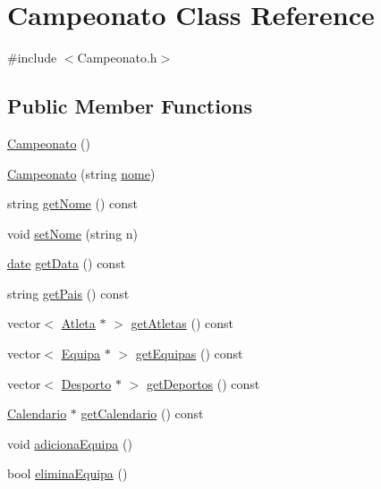 \hypertarget{class_campeonato}{}\section{Campeonato Class Reference}
\label{class_campeonato}


{\ttfamily \#include $<$Campeonato.\+h$>$}

\subsection*{Public Member Functions}
\begin{DoxyCompactItemize}
\item 
\hyperlink{class_campeonato_aa14214a5863681b19922ad1515a3d14b}{Campeonato} ()
\item 
\hyperlink{class_campeonato_a6cdd161a2ea5ffd62810e8bfd4a4dc6c}{Campeonato} (string \hyperlink{class_campeonato_a670b0857b7a8bc3c5dbf0f927ee192fe}{nome})
\item 
string \hyperlink{class_campeonato_ae014ca753715e808b6d67c73f241f27d}{get\+Nome} () const 
\item 
void \hyperlink{class_campeonato_ab2654ae701c2418dab5c70aa4cd74b57}{set\+Nome} (string n)
\item 
\hyperlink{structdate}{date} \hyperlink{class_campeonato_ab78957e0803c30d318455d3d2b4f843b}{get\+Data} () const 
\item 
string \hyperlink{class_campeonato_a152f1d8474275af981214ed24663bf3f}{get\+Pais} () const 
\item 
vector$<$ \hyperlink{class_atleta}{Atleta} $\ast$ $>$ \hyperlink{class_campeonato_ab37dc7253ffed81cc81e90c569d83cf9}{get\+Atletas} () const 
\item 
vector$<$ \hyperlink{class_equipa}{Equipa} $\ast$ $>$ \hyperlink{class_campeonato_ac82ee7c13b116b71525cff9f557b45c2}{get\+Equipas} () const 
\item 
vector$<$ \hyperlink{class_desporto}{Desporto} $\ast$ $>$ \hyperlink{class_campeonato_aa07da18865320276e7ea4506cc81d8fe}{get\+Deportos} () const 
\item 
\hyperlink{class_calendario}{Calendario} $\ast$ \hyperlink{class_campeonato_afb142b85e3413714cb1eecfc3e474f5c}{get\+Calendario} () const 
\item 
void \hyperlink{class_campeonato_a61f99e0dac86a67b21facebdc6a6d6a1}{adiciona\+Equipa} ()
\item 
bool \hyperlink{class_campeonato_a059f992f3a9932dbcf232541640b4b45}{elimina\+Equipa} ()
\item 

\end{DoxyCompactItemize}

